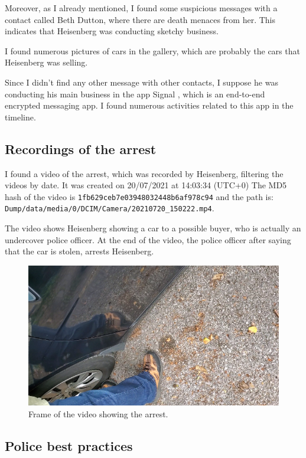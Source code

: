 \documentclass[12pt]{article}
\begin{document}
Moreover, as I already mentioned, I found some suspicious messages with a contact called Beth Dutton, where there are death menaces from her. This indicates that Heisenberg was conducting sketchy business.

I found numerous pictures of cars in the gallery, which are probably the cars that Heisenberg was selling. 

Since I didn't find any other message with other contacts, I suppose he was conducting his main business in the app Signal \cite{signal}, which is an end-to-end encrypted messaging app. I found numerous activities related to this app in the timeline.

\subsection{Recordings of the arrest}

I found a video of the arrest, which was recorded by Heisenberg, filtering the videos by date.
It was created on 20/07/2021 at 14:03:34 (UTC+0)
The MD5 hash of the video is \texttt{1fb629ceb7e03948032448b6af978c94} and the path is:\\
\texttt{Dump/data/media/0/DCIM/Camera/20210720\_150222.mp4}.

The video shows Heisenberg showing a car to a possible buyer, who is actually an undercover police officer. At the end of the video, the police officer after saying that the car is stolen, arrests Heisenberg.


\begin{figure}[!ht]
    \centering
    \includegraphics[width=\textwidth]{images/arrest-frame.png}
    \caption{Frame of the video showing the arrest.}
    \label{fig:rec-file}
\end{figure}

\subsection{Police best practices}
\end{document}
